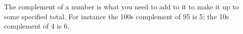 The complement of a number is what you need to add to it to make it up to some 
specified total. For instance the 100s complement of 95 is 5; the 10s 
complement of 4 is 6.